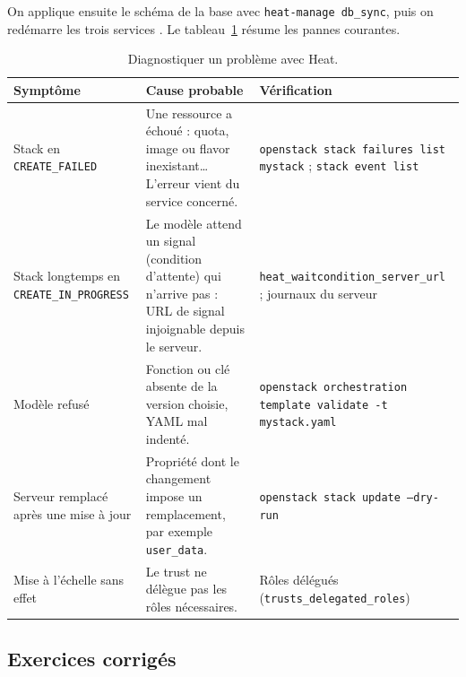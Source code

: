 On applique ensuite le schéma de la base avec \texttt{heat-manage db\_sync}, puis on redémarre les trois services
\parencite{heat-install}. Le tableau~\ref{tab:he-pannes} résume les pannes courantes.

\begin{table}[!ht]
\centering
\renewcommand{\arraystretch}{1.3}
\begin{tabular}{@{}>{\raggedright\arraybackslash}p{4.0cm}>{\raggedright\arraybackslash}p{6.6cm}>{\raggedright\arraybackslash}p{4.9cm}@{}}
\toprule
\textbf{Symptôme} & \textbf{Cause probable} & \textbf{Vérification} \\
\midrule
Stack en \texttt{CREATE\_\allowbreak FAILED} & Une ressource a échoué : quota, image ou flavor inexistant\dots{} L'erreur vient du service concerné. & \texttt{openstack stack failures list mystack} ; \texttt{stack event list} \\
Stack longtemps en \texttt{CREATE\_\allowbreak IN\_\allowbreak PROGRESS} & Le modèle attend un signal (condition d'attente) qui n'arrive pas : URL de signal injoignable depuis le serveur. & \texttt{heat\_\allowbreak waitcondition\_\allowbreak server\_\allowbreak url} ; journaux du serveur \\
Modèle refusé & Fonction ou clé absente de la version choisie, YAML mal indenté. & \texttt{openstack orchestration template validate -t mystack.yaml} \\
Serveur remplacé après une mise à jour & Propriété dont le changement impose un remplacement, par exemple \texttt{user\_data}. & \texttt{openstack stack update --dry-run} \\
Mise à l'échelle sans effet & Le trust ne délègue pas les rôles nécessaires. & Rôles délégués (\texttt{trusts\_\allowbreak delegated\_\allowbreak roles}) \\
\bottomrule
\end{tabular}
\caption{Diagnostiquer un problème avec Heat.}
\label{tab:he-pannes}
\end{table}

\clearpage
\subsection{Exercices corrigés}\label{sec:he-exercices}

